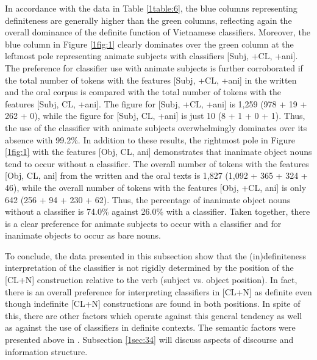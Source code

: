 \documentclass[output=paper]{langsci/langscibook}
\begin{document}
In accordance with the data in Table \ref{1table:6}, the blue columns representing definiteness are generally higher than the green columns, reflecting again the overall dominance of the definite function of Vietnamese classifiers. Moreover, the blue column in Figure \ref{1fig:1} clearly dominates over the green column at the leftmost pole representing animate subjects with classifiers [Subj, +CL, +ani]. The preference for classifier use with animate subjects is further corroborated if the total number of tokens with the features [Subj, +CL, +ani] in the written and the oral corpus is compared with the total number of tokens with the features [Subj, \minus CL, +ani]. The figure for [Subj, +CL, +ani] is 1,259 (978 + 19 + 262 + 0), while the figure for [Subj, \minus CL, +ani] is just 10 (8 + 1 + 0 + 1). Thus, the use of the classifier with animate subjects overwhelmingly dominates over its absence with 99.2\%. In addition to these results, the rightmost pole in Figure \ref{1fig:1} with the features [Obj, \minus CL, \minus ani] demonstrates that inanimate object nouns tend to occur without a classifier. The overall number of tokens with the features [Obj, \minus CL, \minus ani] from the written and the oral texts is 1,827 (1,092 + 365 + 324 + 46), while the overall number of tokens with the features [Obj, +CL, \minus ani] is only 642 (256 + 94 + 230 + 62). Thus, the percentage of inanimate object nouns without a classifier is 74.0\% against 26.0\% with a classifier. Taken together, there is a clear preference for animate subjects to occur with a classifier and for inanimate objects to occur as bare nouns.

\largerpage
To conclude, the data presented in this subsection show that the (in)definite\-ness interpretation of the classifier is not rigidly determined by the position of the [CL+N] construction relative to the verb (subject vs. object position). In fact, there is an overall preference for interpreting classifiers in [CL+N] as definite even though indefinite [CL+N] constructions are found in both positions. In spite of this, there are other factors which operate against this general tendency as well as against the use of classifiers in definite contexts. The semantic factors were presented above in . Subsection \ref{1sec:34} will discuss aspects of discourse and information structure.
\end{document}
